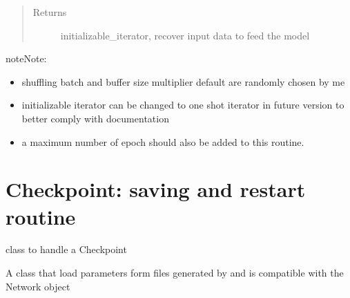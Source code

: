 \documentclass[letterpaper,10pt,english]{sphinxmanual}
\begin{document}
\begin{fulllineitems}
\begin{quote}
\begin{description}
\item[{Returns}] \leavevmode
initializable\_iterator, recover input data to feed the model

\end{description}\end{quote}

\begin{sphinxadmonition}{note}{Note:}\begin{itemize}
\item {} 
shuffling batch and buffer size multiplier default are
randomly chosen by me

\item {} 
initializable iterator can be changed to one shot iterator
in future version to better comply with documentation

\item {} 
a maximum number of epoch should also be added to this routine.

\end{itemize}
\end{sphinxadmonition}

\end{fulllineitems}



\chapter{Checkpoint: saving and restart routine}
\label{\detokenize{neuralnet/checkpoint:module-checkpoint}}\label{\detokenize{neuralnet/checkpoint:checkpoint-saving-and-restart-routine}}\label{\detokenize{neuralnet/checkpoint::doc}}

\begin{fulllineitems}
\label{\detokenize{neuralnet/checkpoint:checkpoint.Checkpoint}}
class to handle a Checkpoint

\end{fulllineitems}


\begin{fulllineitems}
\label{\detokenize{neuralnet/checkpoint:checkpoint.Parameters}}
A class that load parameters form files generated by  and is compatible
with the Network object

\end{fulllineitems}
\end{document}
